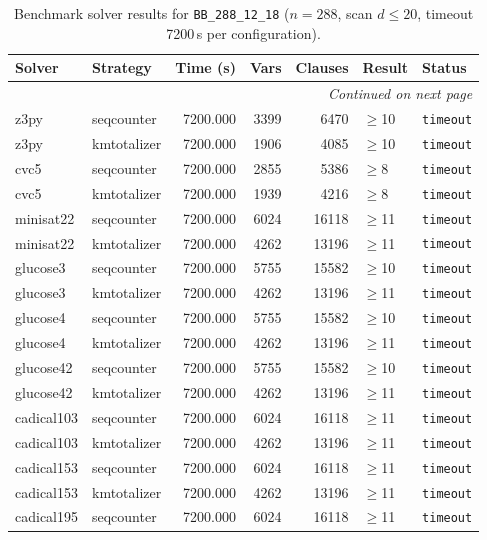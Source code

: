 \begin{longtable}{llrrrl p{}}
\caption{Benchmark solver results for \texttt{BB\_288\_12\_18} ($n=288$, scan $d \leq 20$, timeout 7200\,s per configuration).} \label{tab:bench-BB_288_12_18} \\
\toprule
Solver & Strategy & Time (s) & Vars & Clauses & Result & Status \\
\midrule
\endhead
\midrule
\multicolumn{7}{r}{\textit{Continued on next page}} \\
\midrule
\endfoot
\bottomrule
\endlastfoot
z3py & seqcounter & 7200.000 & 3399 & 6470 & $\geq$10 & \texttt{timeout} \\
z3py & kmtotalizer & 7200.000 & 1906 & 4085 & $\geq$10 & \texttt{timeout} \\
cvc5 & seqcounter & 7200.000 & 2855 & 5386 & $\geq$8 & \texttt{timeout} \\
cvc5 & kmtotalizer & 7200.000 & 1939 & 4216 & $\geq$8 & \texttt{timeout} \\
minisat22 & seqcounter & 7200.000 & 6024 & 16118 & $\geq$11 & \texttt{timeout} \\
minisat22 & kmtotalizer & 7200.000 & 4262 & 13196 & $\geq$11 & \texttt{timeout} \\
glucose3 & seqcounter & 7200.000 & 5755 & 15582 & $\geq$10 & \texttt{timeout} \\
glucose3 & kmtotalizer & 7200.000 & 4262 & 13196 & $\geq$11 & \texttt{timeout} \\
glucose4 & seqcounter & 7200.000 & 5755 & 15582 & $\geq$10 & \texttt{timeout} \\
glucose4 & kmtotalizer & 7200.000 & 4262 & 13196 & $\geq$11 & \texttt{timeout} \\
glucose42 & seqcounter & 7200.000 & 5755 & 15582 & $\geq$10 & \texttt{timeout} \\
glucose42 & kmtotalizer & 7200.000 & 4262 & 13196 & $\geq$11 & \texttt{timeout} \\
cadical103 & seqcounter & 7200.000 & 6024 & 16118 & $\geq$11 & \texttt{timeout} \\
cadical103 & kmtotalizer & 7200.000 & 4262 & 13196 & $\geq$11 & \texttt{timeout} \\
cadical153 & seqcounter & 7200.000 & 6024 & 16118 & $\geq$11 & \texttt{timeout} \\
cadical153 & kmtotalizer & 7200.000 & 4262 & 13196 & $\geq$11 & \texttt{timeout} \\
cadical195 & seqcounter & 7200.000 & 6024 & 16118 & $\geq$11 & \texttt{timeout} \\

\end{longtable}
